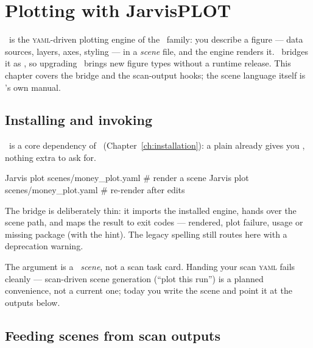 \chapter{Plotting with JarvisPLOT}
\label{ch:jarvisplot}

 \JPlot\ is the \textsc{yaml}-driven
plotting engine of the \Jarvis\ family: you describe a figure --- data sources, layers,
axes, styling --- in a \emph{scene} file, and the engine renders it. \Jtwo\ bridges it
as , so upgrading \JPlot\ brings new figure types without a runtime
release. This chapter covers the bridge and the scan-output hooks; the scene language
itself is \JPlot's own manual.

\section{Installing and invoking}
\label{sec:plot-install}

\JPlot\ is a core dependency of \Jtwo\ (Chapter~\ref{ch:installation}): a plain
 already gives you , nothing extra to ask
for.

\begin{terminal}
\begin{jcmd}
Jarvis plot scenes/money_plot.yaml               # render a scene
Jarvis plot scenes/money_plot.yaml               # re-render after edits
\end{jcmd}
\end{terminal}

The bridge is deliberately thin: it imports the installed engine, hands over the scene
path, and maps the result to exit codes ---  rendered,  plot failure,
 usage or missing package (with the  hint). The legacy
spelling  still routes here with a deprecation
warning.

\begin{jwarn}
The argument is a \JPlot\ \emph{scene}, not a scan task card. Handing  your
scan \textsc{yaml} fails cleanly --- scan-driven scene generation (``plot this run'')
is a planned convenience, not a current one; today you write the scene and point it at
the outputs below.
\end{jwarn}

\section{Feeding scenes from scan outputs}
\label{sec:plot-data}

